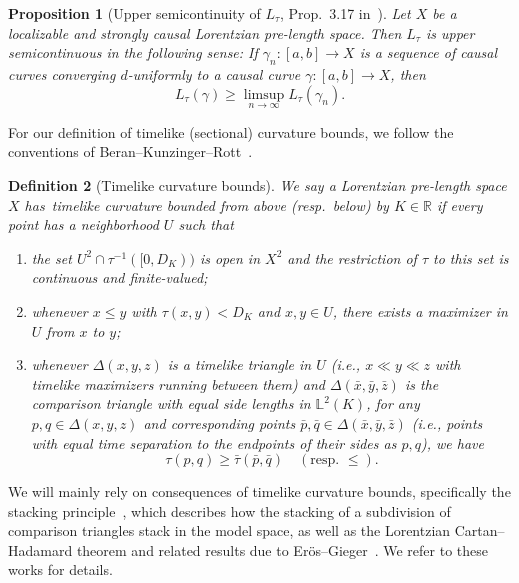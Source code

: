 \documentclass[a4paper,11pt]{article}
\numberwithin{equation}{section}
\theoremstyle{plain}
\newtheorem{Definition}{Definition}[section]
\newtheorem{Proposition}[Definition]{Proposition}
\theoremstyle{definition}
\newcommand{\R}{\mathbb R}
\begin{document}
\begin{Proposition}[Upper semicontinuity of $L_\tau$, Prop.\ 3.17 in~\cite{kunzinger2018lorentzian}]
Let $X$ be a localizable and strongly causal Lorentzian pre-length space. Then $L_\tau$ is upper semicontinuous in the following sense: If $\gamma_n \colon [a,b] \to X$ is a sequence of causal curves converging $d$-uniformly to a causal curve $\gamma \colon [a,b] \to X$, then
\begin{equation}
    L_\tau(\gamma) \geq \limsup_{n \to \infty} L_\tau(\gamma_n).
\end{equation}
\end{Proposition}

For our definition of timelike (sectional) curvature bounds, we follow the conventions of Beran--Kunzinger--Rott~\cite[Def.\ 3.1]{BKR24}.

\begin{Definition}[Timelike curvature bounds]
We say a Lorentzian pre-length space $X$ has~\emph{timelike curvature bounded from above (resp.\ below)\/} by $K \in \R$ if every point has a neighborhood $U$ such that
\begin{enumerate}
    \item the set $U^2 \cap \tau^{-1}([0,D_K))$ is open in $X^2$ and the restriction of $\tau$ to this set is continuous and finite-valued;
    \item whenever $x \leq y$ with $\tau(x,y) < D_K$ and $x,y \in U$, there exists a maximizer in $U$ from $x$ to $y$;
    \item whenever $\Delta(x,y,z)$ is a timelike triangle in $U$ (i.e., $x \ll y \ll z$ with timelike maximizers running between them) and $\Delta(\bar{x},\bar{y},\bar{z})$ is the comparison triangle with equal side lengths in $\mathbb{L}^2(K)$, for any $p,q \in \Delta(x,y,z)$ and corresponding points $\bar{p},\bar{q} \in \Delta(\bar{x},\bar{y},\bar{z})$ (i.e., points with equal time separation to the endpoints of their sides as $p,q$), we have
    \begin{equation}
        \tau(p,q) \geq \bar{\tau}(\bar{p},\bar{q}) \quad (\text{resp.\ }\leq).
    \end{equation}
\end{enumerate}
\end{Definition}

We will mainly rely on consequences of timelike curvature bounds, specifically the stacking principle~\cite[Prop.\ 2.42]{beran2023splitting}, which describes how the stacking of a subdivision of comparison triangles stack in the model space, as well as the Lorentzian Cartan--Hadamard theorem and related results due to Er\"{o}s--Gieger~\cite{Eroes-Gieger25}. We refer to these works for details.
\end{document}
